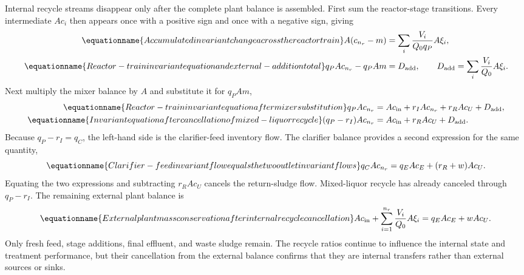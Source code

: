 Internal recycle streams disappear only after the complete plant balance is assembled. First sum the reactor-stage transitions. Every intermediate $Ac_i$ then appears once with a positive sign and once with a negative sign, giving
\begin{align}
\equationname{Accumulated invariant change across the reactor train}
A(c_{n_r}-m)&=\sum_i\frac{V_i}{Q_0q_P}A\xi_i,\\
\equationname{Reactor-train invariant equation and external-addition total}
q_PAc_{n_r}-q_PAm&=D_{\rm add},\qquad
D_{\rm add}=\sum_i\frac{V_i}{Q_0}A\xi_i.
\end{align}
Next multiply the mixer balance by $A$ and substitute it for $q_PAm$,
\begin{align}
\equationname{Reactor-train invariant equation after mixer substitution}
q_PAc_{n_r}&=Ac_{\rm in}+r_IAc_{n_r}+r_RAc_U+D_{\rm add},\\
\equationname{Invariant equation after cancellation of mixed-liquor recycle}
(q_P-r_I)Ac_{n_r}&=Ac_{\rm in}+r_RAc_U+D_{\rm add}.
\end{align}
Because $q_P-r_I=q_C$, the left-hand side is the clarifier-feed inventory flow. The clarifier balance provides a second expression for the same quantity,
\begin{equation}
\equationname{Clarifier-feed invariant flow equals the two outlet invariant flows}
q_CAc_{n_r}=q_EAc_E+(r_R+w)Ac_U.
\end{equation}
Equating the two expressions and subtracting $r_RAc_U$ cancels the return-sludge flow. Mixed-liquor recycle has already canceled through $q_P-r_I$. The remaining external plant balance is
\begin{equation}
\equationname{External plant mass conservation after internal recycle cancellation}
Ac_{\rm in}+\sum_{i=1}^{n_r}\frac{V_i}{Q_0}A\xi_i
=q_EAc_E+wAc_U.
\label{eq:plant_external_invariant}
\end{equation}
Only fresh feed, stage additions, final effluent, and waste sludge remain. The recycle ratios continue to influence the internal state and treatment performance, but their cancellation from the external balance confirms that they are internal transfers rather than external sources or sinks.

